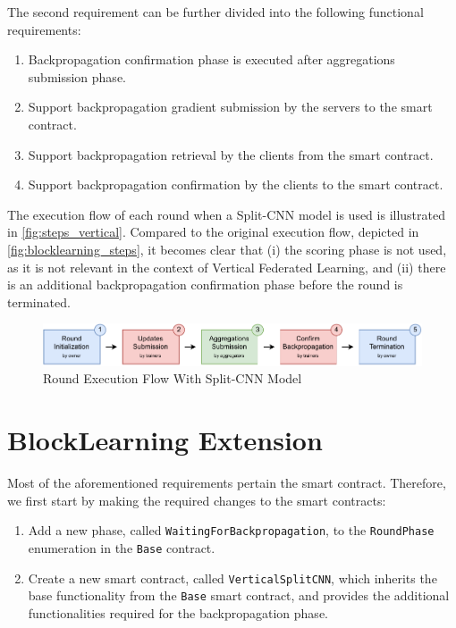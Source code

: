 The second requirement can be further divided into the following functional requirements:

\begin{enumerate}
    \item Backpropagation confirmation phase is executed after aggregations submission phase.
    \item Support backpropagation gradient submission by the servers to the smart contract.
    \item Support backpropagation retrieval by the clients from the smart contract.
    \item Support backpropagation confirmation by the clients to the smart contract.
\end{enumerate}

The execution flow of each round when a Split-CNN model is used is illustrated in \autoref{fig:steps_vertical}. Compared to the original execution flow, depicted in \autoref{fig:blocklearning_steps}, it becomes clear that (i) the scoring phase is not used, as it is not relevant in the context of Vertical Federated Learning, and (ii) there is an additional backpropagation confirmation phase before the round is terminated. 

\begin{figure}[!ht]
    \centering
    \includegraphics[width=1\textwidth]{graphics/sequence-vertical.pdf}
    \caption{Round Execution Flow With Split-CNN Model}
    \label{fig:steps_vertical}
\end{figure}

\section{BlockLearning Extension}

Most of the aforementioned requirements pertain the smart contract. Therefore, we first start by making the required changes to the smart contracts:

\begin{enumerate}
    \item Add a new phase, called \texttt{WaitingForBackpropagation}, to the \texttt{RoundPhase} enumeration in the \texttt{Base} contract.
    
    \item Create a new smart contract, called \texttt{VerticalSplitCNN}, which inherits the base functionality from the \texttt{Base} smart contract, and provides the additional functionalities required for the backpropagation phase.
\end{enumerate}

